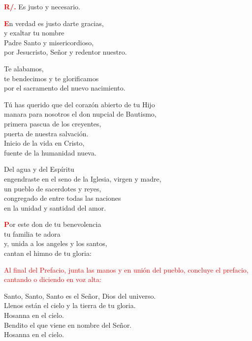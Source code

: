\documentclass[12pt, letterpaper, spanish]{article}
\begin{document}
  \Large {\bfseries \textcolor{red}{R/.}} \hspace{0.5cm} Es justo y necesario.

  \lettrine[lines=2]{\bfseries \textcolor{red}{E}}{}\Large n verdad es justo darte gracias, \\ 
  y exaltar tu nombre \\ 
  Padre Santo y misericordioso, \\
  por Jesucristo, Se\~nor y redentor nuestro.

  \noindent
  Te alabamos, \\
  te bendecimos y te glorificamos \\
  por el sacramento del nuevo nacimiento.

  \noindent
  T\'u has querido que del coraz\'on abierto de tu Hijo \\
  manara para nosotros el don nupcial de Bautismo, \\
  primera pascua de los creyentes, \\
  puerta de nuestra salvaci\'on. \\
  Inicio de la vida en Cristo, \\
  fuente de la humanidad nueva.

  \noindent
  Del agua y del Esp\'iritu \\
  engendraste en el seno de la Iglesia, virgen y madre, \\
  un pueblo de sacerdotes y reyes, \\
  congregado de entre todas las naciones \\
  en la unidad y santidad del amor.

  \lettrine[lines=2]{\bfseries \textcolor{red}{P}}{}\Large or este don de tu benevolencia \\
  tu familia te adora \\
  y, unida a los angeles y los santos, \\
  cantan el himno de tu gloria:

  \large{\textcolor{red}{Al final del Prefacio, junta las manos y en uni\'on del pueblo, concluye el prefacio, cantando o diciendo en voz alta:}}
  \clearpage

  \Large {Santo, Santo, Santo es el Se\~nor, Dios del universo.\\
  Llenos est\'an el cielo y la tierra de tu gloria.\\
  Hosanna en el cielo.\\
  Bendito el que viene en nombre del Se\~nor.\\
  Hosanna en el cielo.}
\end{document}
